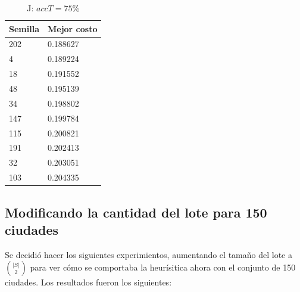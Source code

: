 \documentclass{article}
\begin{document}
\begin{table}[!htbp]
    \begin{minipage}{\linewidth}
      \centering
      \caption{J: $accT = 75 \%$}
      \begin{tabular}{l|l}
        Semilla & Mejor costo \\
        \hline
        202     & 0.188627 \\
        \hline
        4       & 0.189224 \\
        \hline
        18      & 0.191552 \\
        \hline
        48      & 0.195139 \\
        \hline
        34      & 0.198802 \\
        \hline
        147     & 0.199784 \\
        \hline
        115     & 0.200821 \\
        \hline
        191     & 0.202413 \\
        \hline
        32      & 0.203051 \\
        \hline
        103     & 0.204335 \\
      \end{tabular}
    \end{minipage} 
  \end{table}

  \clearpage

  \subsection{Modificando la cantidad del lote para 150 ciudades}
  Se decidió hacer los siguientes experimientos, aumentando el 
  tamaño del lote a $\binom{|S|}{2}$ para ver cómo se comportaba 
  la heurísitica ahora con el conjunto de 150 ciudades.
  Los resultados fueron los siguientes:
\end{document}
